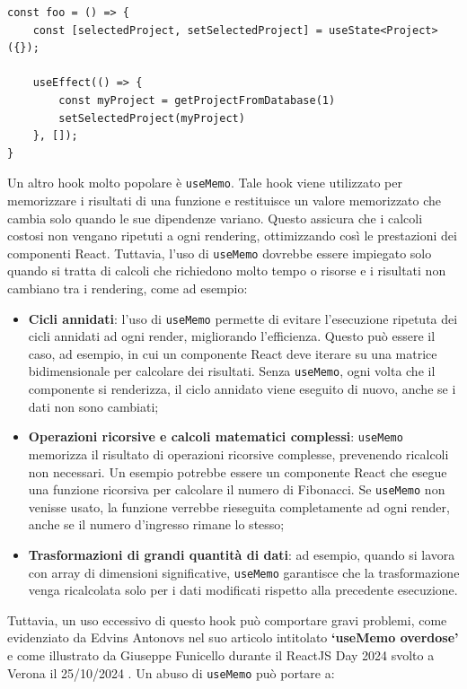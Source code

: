 \documentclass[target=bach,aauheader=,style=]{thud}
\begin{document}
\begin{lstlisting}[caption=\texttt{useEffect} e \texttt{useState} per ottenere e salvare un progetto in uno stato locale]
const foo = () => {
    const [selectedProject, setSelectedProject] = useState<Project>({});

    useEffect(() => {
        const myProject = getProjectFromDatabase(1)
        setSelectedProject(myProject)
    }, []);
}
\end{lstlisting}

\noindent Un altro hook molto popolare è \texttt{useMemo}. Tale hook viene utilizzato per memorizzare i risultati di una funzione e restituisce un valore memorizzato che cambia solo quando le sue dipendenze variano. Questo assicura che i calcoli costosi non vengano ripetuti a ogni rendering, ottimizzando così le prestazioni dei componenti React. Tuttavia, l'uso di \texttt{useMemo} dovrebbe essere impiegato solo quando si tratta di calcoli che richiedono molto tempo o risorse e i risultati non cambiano tra i rendering, come ad esempio:

\begin{itemize}
    \item \textbf{Cicli annidati}: l'uso di \texttt{useMemo} permette di evitare l'esecuzione ripetuta dei cicli annidati ad ogni render, migliorando l'efficienza. Questo può essere il caso, ad esempio, in cui un componente React deve iterare su una matrice bidimensionale per calcolare dei risultati. Senza \texttt{useMemo}, ogni volta che il componente si renderizza, il ciclo annidato viene eseguito di nuovo, anche se i dati non sono cambiati;
    \item \textbf{Operazioni ricorsive e calcoli matematici complessi}: \texttt{useMemo} memorizza il risultato di operazioni ricorsive complesse, prevenendo ricalcoli non necessari. Un esempio potrebbe essere un componente React che esegue una funzione ricorsiva per calcolare il numero di Fibonacci. Se \texttt{useMemo} non venisse usato, la funzione verrebbe rieseguita completamente ad ogni render, anche se il numero d'ingresso rimane lo stesso;
    \item \textbf{Trasformazioni di grandi quantità di dati}: ad esempio, quando si lavora con array di dimensioni significative, \texttt{useMemo} garantisce che la trasformazione venga ricalcolata solo per i dati modificati rispetto alla precedente esecuzione.
\end{itemize}

\noindent Tuttavia, un uso eccessivo di questo hook può comportare gravi problemi, come evidenziato da Edvins Antonovs nel suo articolo intitolato \textbf{`useMemo overdose'} \cite{edvins2024usememo} e come illustrato da Giuseppe Funicello durante il ReactJS Day 2024 svolto a Verona il 25/10/2024 \cite{funicello2024reactjsday}. Un abuso di \texttt{useMemo} può portare a:
\end{document}

